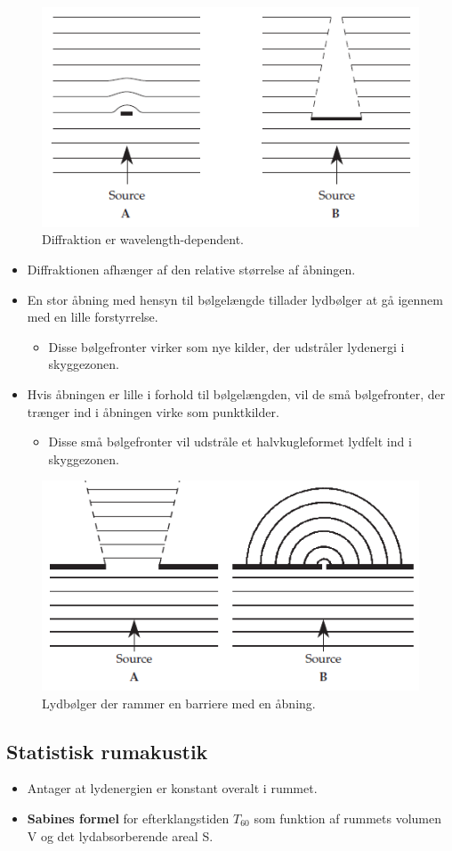 \begin{figure} [H]
	\centering
	\includegraphics[width=.5\linewidth]{graphics/15.png}
	\caption{Diffraktion er wavelength-dependent.}
	\label{fig:15}
\end{figure}

\begin{itemize}
	\item Diffraktionen afhænger af	den relative størrelse af åbningen. 
	\item En stor åbning med hensyn til bølgelængde tillader lydbølger at gå igennem med en lille forstyrrelse. 
	\begin{itemize}
		\item Disse bølgefronter virker som nye kilder, der udstråler lydenergi i skyggezonen.
	\end{itemize}
	\item Hvis åbningen er lille i forhold til bølgelængden, vil de små bølgefronter, der trænger ind i åbningen virke som punktkilder.
	\begin{itemize}
		\item Disse små bølgefronter vil udstråle et halvkugleformet lydfelt ind i skyggezonen.
	\end{itemize} 
\end{itemize}

\begin{figure} [H]
	\centering
	\includegraphics[width=.5\linewidth]{graphics/16.png}
	\caption{Lydbølger der rammer en barriere med en åbning.}
	\label{fig:16}
\end{figure}


\subsection{Statistisk rumakustik}
\begin{itemize}
	\item Antager at lydenergien er konstant overalt i rummet.
	\item \textbf{Sabines formel} for efterklangstiden $T_{60}$ som funktion af rummets volumen V og det lydabsorberende areal S.
\end{itemize}

